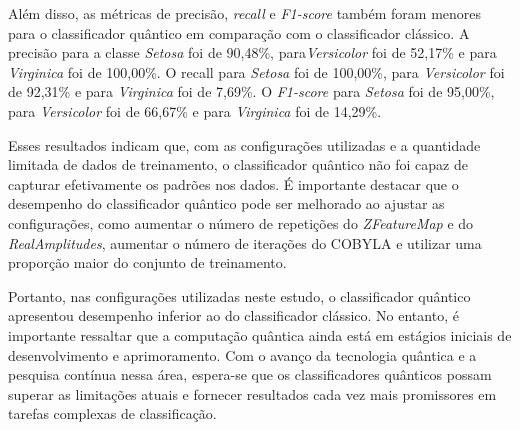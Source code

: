 Além disso, as métricas de precisão, \textit{recall} e \textit{F1-score} também foram menores para o classificador quântico em comparação com o classificador clássico. A precisão para a classe \textit{Setosa} foi de 90,48\%, para\textit{Versicolor} foi de 52,17\% e para \textit{Virginica} foi de 100,00\%. O recall para \textit{Setosa} foi de 100,00\%, para \textit{Versicolor} foi de 92,31\% e para \textit{Virginica} foi de 7,69\%. O \textit{F1-score} para \textit{Setosa} foi de 95,00\%, para \textit{Versicolor} foi de 66,67\% e para \textit{Virginica} foi de 14,29\%.

Esses resultados indicam que, com as configurações utilizadas e a quantidade limitada de dados de treinamento, o classificador quântico não foi capaz de capturar efetivamente os padrões nos dados. É importante destacar que o desempenho do classificador quântico pode ser melhorado ao ajustar as configurações, como aumentar o número de repetições do \textit{ZFeatureMap} e do \textit{RealAmplitudes}, aumentar o número de iterações do COBYLA e utilizar uma proporção maior do conjunto de treinamento.

Portanto, nas configurações utilizadas neste estudo, o classificador quântico apresentou desempenho inferior ao do classificador clássico. No entanto, é importante ressaltar que a computação quântica ainda está em estágios iniciais de desenvolvimento e aprimoramento. Com o avanço da tecnologia quântica e a pesquisa contínua nessa área, espera-se que os classificadores quânticos possam superar as limitações atuais e fornecer resultados cada vez mais promissores em tarefas complexas de classificação.